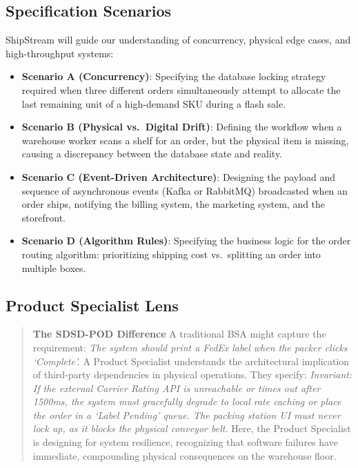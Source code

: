 \subsection{Specification Scenarios}\label{specification-scenarios-2}

ShipStream will guide our understanding of concurrency, physical edge
cases, and high-throughput systems:

\begin{itemize}
\tightlist
\item
  \textbf{Scenario A (Concurrency)}: Specifying the database locking
  strategy required when three different orders simultaneously attempt
  to allocate the last remaining unit of a high-demand SKU during a
  flash sale.
\item
  \textbf{Scenario B (Physical vs.~Digital Drift)}: Defining the
  workflow when a warehouse worker scans a shelf for an order, but the
  physical item is missing, causing a discrepancy between the database
  state and reality.
\item
  \textbf{Scenario C (Event-Driven Architecture)}: Designing the payload
  and sequence of asynchronous events (Kafka or RabbitMQ) broadcasted
  when an order ships, notifying the billing system, the marketing
  system, and the storefront.
\item
  \textbf{Scenario D (Algorithm Rules)}: Specifying the business logic
  for the order routing algorithm: prioritizing shipping cost
  vs.~splitting an order into multiple boxes.
\end{itemize}

\subsection{Product Specialist Lens}\label{product-specialist-lens-2}

\begin{quote}
\textbf{The SDSD-POD Difference} A traditional BSA might capture the
requirement: \emph{The system should print a FedEx label when the packer
clicks `Complete'.} A Product Specialist understands the architectural
implication of third-party dependencies in physical operations. They
specify: \emph{Invariant: If the external Carrier Rating API is
unreachable or times out after 1500ms, the system must gracefully
degrade to local rate caching or place the order in a `Label Pending'
queue. The packing station UI must never lock up, as it blocks the
physical conveyor belt.} Here, the Product Specialist is designing for
system resilience, recognizing that software failures have immediate,
compounding physical consequences on the warehouse floor.
\end{quote}

